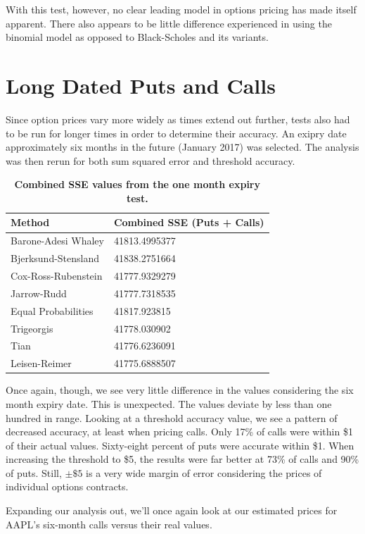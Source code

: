 With this test, however, no clear leading model in options pricing has made itself apparent. There also appears to be little difference experienced in using the binomial model as opposed to Black-Scholes and its variants.

\section{Long Dated Puts and Calls}

Since option prices vary more widely as times extend out further, tests also had to be run for longer times in order to determine their accuracy. An exipry date approximately six months in the future (January 2017) was selected. The analysis was then rerun for both sum squared error and threshold accuracy. 

\begin{table}[h!]
\centering
\begin{tabu} to .8\textwidth { | X[c] | X[c] | }
 \hline
Method & Combined SSE (Puts + Calls)\\
 \hline
Barone-Adesi Whaley & 41813.4995377\\
Bjerksund-Stensland &  41838.2751664\\
Cox-Ross-Rubenstein & 41777.9329279\\
Jarrow-Rudd & 41777.7318535 \\
 Equal Probabilities & 41817.923815\\
Trigeorgis & 41778.030902 \\
Tian & 41776.6236091\\
Leisen-Reimer & 41775.6888507\\
\hline
\end{tabu}
\caption {\textbf{Combined SSE values from the one month expiry test.}}
\end{table}


Once again, though, we see very little difference in the values considering the six month expiry date. This is unexpected.  The values deviate by less than one hundred in range. Looking at a threshold accuracy value, we see a pattern of decreased accuracy, at least when pricing calls. Only 17\% of calls were within \$1 of their actual values. Sixty-eight percent of puts were accurate within \$1. When increasing the threshold to \$5, the results were far better at 73\% of calls and 90\% of puts. Still, $\pm\$5$ is a very wide margin of error considering the prices of individual options contracts.

Expanding our analysis out, we'll once again look at our estimated prices for AAPL's six-month calls versus their real values. 

